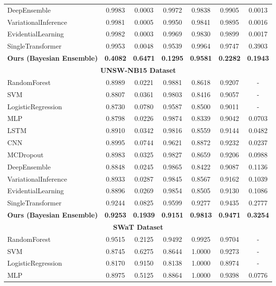 \begin{table}[htbp]
\begin{tabular}{l|ccccc|c}
DeepEnsemble & 0.9983 & 0.0003 & 0.9972 & 0.9838 & 0.9905 & 0.0013 \\
VariationalInference & 0.9981 & 0.0005 & 0.9950 & 0.9841 & 0.9895 & 0.0016 \\
EvidentialLearning & 0.9982 & 0.0003 & 0.9969 & 0.9830 & 0.9899 & 0.0017 \\
SingleTransformer & 0.9953 & 0.0048 & 0.9539 & 0.9964 & 0.9747 & 0.3903 \\
\textbf{Ours (Bayesian Ensemble)} & \textbf{0.4082} & \textbf{0.6471} & \textbf{0.1295} & \textbf{0.9581} & \textbf{0.2282} & \textbf{0.1943} \\
\hline
\multicolumn{7}{c}{\textbf{UNSW-NB15 Dataset}} \\
\hline
RandomForest & 0.8989 & 0.0221 & 0.9881 & 0.8618 & 0.9207 & - \\
SVM & 0.8807 & 0.0361 & 0.9803 & 0.8416 & 0.9057 & - \\
LogisticRegression & 0.8730 & 0.0780 & 0.9587 & 0.8500 & 0.9011 & - \\
MLP & 0.8798 & 0.0226 & 0.9874 & 0.8339 & 0.9042 & 0.0703 \\
LSTM & 0.8910 & 0.0342 & 0.9816 & 0.8559 & 0.9144 & 0.0482 \\
CNN & 0.8995 & 0.0744 & 0.9621 & 0.8872 & 0.9232 & 0.0237 \\
MCDropout & 0.8983 & 0.0325 & 0.9827 & 0.8659 & 0.9206 & 0.0988 \\
DeepEnsemble & 0.8848 & 0.0245 & 0.9865 & 0.8422 & 0.9087 & 0.1136 \\
VariationalInference & 0.8933 & 0.0287 & 0.9845 & 0.8567 & 0.9162 & 0.1039 \\
EvidentialLearning & 0.8896 & 0.0269 & 0.9854 & 0.8505 & 0.9130 & 0.1086 \\
SingleTransformer & 0.9244 & 0.0825 & 0.9599 & 0.9277 & 0.9435 & 0.2777 \\
\textbf{Ours (Bayesian Ensemble)} & \textbf{0.9253} & \textbf{0.1939} & \textbf{0.9151} & \textbf{0.9813} & \textbf{0.9471} & \textbf{0.3254} \\
\hline
\multicolumn{7}{c}{\textbf{SWaT Dataset}} \\
\hline
RandomForest & 0.9515 & 0.2125 & 0.9492 & 0.9925 & 0.9704 & - \\
SVM & 0.8745 & 0.6275 & 0.8644 & 1.0000 & 0.9273 & - \\
LogisticRegression & 0.8170 & 0.9150 & 0.8138 & 1.0000 & 0.8974 & - \\
MLP & 0.8975 & 0.5125 & 0.8864 & 1.0000 & 0.9398 & 0.0776 \\

\end{tabular}
\end{table}
